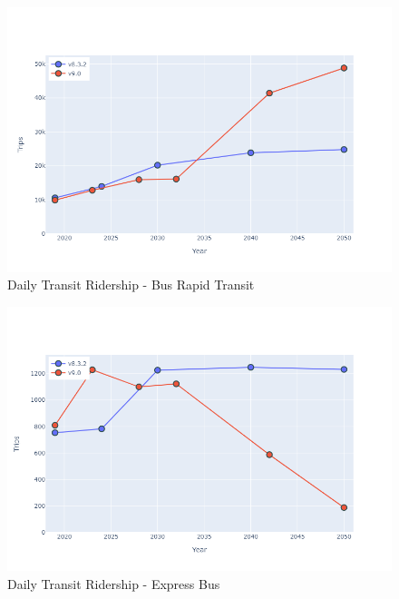 \documentclass[
  letterpaper,
  DIV=11,
  numbers=noendperiod,
  titlepage=false]{scrreprt}
\begin{document}
\begin{figure}[H]

{\centering \includegraphics{v9x/v900/whats-new/_pictures/pdf-hy-tr-brt.png}

}

\caption{\label{fig-pdf-hy-tr-brt}Daily Transit Ridership - Bus Rapid
Transit}

\end{figure}

\begin{figure}[H]

{\centering \includegraphics{v9x/v900/whats-new/_pictures/pdf-hy-tr-exp.png}

}

\caption{\label{fig-pdf-hy-tr-exp}Daily Transit Ridership - Express Bus}

\end{figure}
\end{document}
